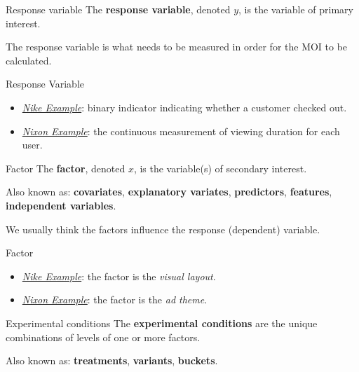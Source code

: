 \begin{Definition}{Response variable}{}
      The \textbf{response variable}, denoted $ y $, is the variable of primary interest.
\end{Definition}
\begin{Remark}{}{}
      The response variable is what needs to be measured in order for the MOI to be calculated.
\end{Remark}
\begin{Example}{Response Variable}{}
      \begin{itemize}
            \item \emph{\hyperref[ex:nike_ex]{Nike Example}}: binary indicator indicating
                  whether a customer checked out.
            \item \emph{\hyperref[ex:nixon_ex]{Nixon Example}}: the continuous measurement
                  of viewing duration for each user.
      \end{itemize}
\end{Example}
\begin{Definition}{Factor}{}
      The \textbf{factor}, denoted $ x $, is the variable(s) of secondary interest.

      \vspace{2mm}

      Also known as: \textbf{covariates}, \textbf{explanatory variates}, \textbf{predictors},
      \textbf{features}, \textbf{independent variables}.
\end{Definition}
\begin{Remark}{}{}
      We usually think the factors influence the response (dependent) variable.
\end{Remark}
\begin{Example}{Factor}{}
      \begin{itemize}
            \item \emph{\hyperref[ex:nike_ex]{Nike Example}}: the factor is the \emph{visual layout}.
            \item \emph{\hyperref[ex:nixon_ex]{Nixon Example}}: the factor is the \emph{ad theme}.
      \end{itemize}
\end{Example}
\begin{Definition}{Experimental conditions}{}
      The \textbf{experimental conditions} are the unique combinations of levels of one or more
      factors.

      \vspace{2mm}

      Also known as: \textbf{treatments}, \textbf{variants}, \textbf{buckets}.
\end{Definition}
